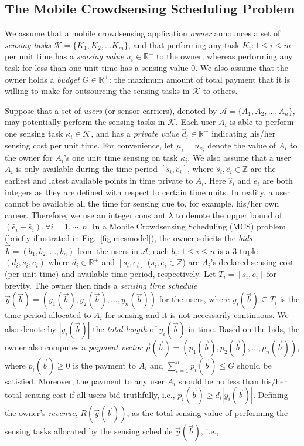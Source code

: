 \documentclass[10pt,journal,compsoc]{IEEEtran}
\begin{document}
  \subsection{The Mobile Crowdsensing Scheduling Problem}
We assume that a mobile crowdsensing application \textit{owner} announces a set of \textit{sensing tasks} $\mathcal{K}=\{K_1,K_2,...K_m\}$, and that performing any task $K_i: 1\leq i\leq m$ per unit time has a \textit{sensing value} $u_i\in \mathbb{R}^+$ to the owner, whereas performing any task for less than one unit time has a sensing value 0.
We also assume that the owner holds a \textit{budget} $G\in \mathbb{R}^+$: the maximum amount of total payment that it is willing to make for outsourcing the sensing tasks in $\mathcal{K}$ to others.

    Suppose that a set of \textit{users} (or sensor carriers), denoted by $\mathcal{A}=\{A_1,A_2,...,A_n\}$, may potentially perform the sensing tasks in $\mathcal{K}$. Each user $A_i$ is able to perform one sensing task $\kappa_i\in \mathcal{K}$, and has a \textit{private value} $\hat{d}_i\in \mathbb{R}^+$ indicating his/her sensing cost per unit time. For convenience, let $\mu_i=u_{\kappa_i}$ denote the value of $A_i$ to the owner for $A_i$'s one unit time sensing on task $\kappa_i$. We also assume that a user $A_i$ is only available during the time period $[\hat{s}_i,\hat{e}_i]$, where $\hat{s}_i,\hat{e}_i \in \mathbb{Z}$ are the earliest and latest available points in time private to $A_i$. Here $\hat{s}_i$ and $\hat{e}_i$ are both integers as they are defined with respect to certain time units. In reality, a user cannot be available all the time for sensing due to, for example, his/her own career. Therefore, we use an integer constant $\lambda$ to denote the upper bound of $(\hat{e}_i - \hat{s}_i), \forall i =  1,\cdots,n$. 
    In a Mobile Crowdsensing Scheduling (MCS) problem (briefly illustrated in Fig.~\ref{fig:mcsmodel}), the owner solicits the \textit{bids} $\vec{b}=(b_1,b_2,...,b_n)$ from the users in $\mathcal{A}$; each $b_i\!:\! 1\leq i\leq n$ is a 3-tuple $(d_i,s_i,e_i)$ where $d_i\in \mathbb{R}^+$ and $[s_i,e_i]$ ($s_i,e_i \in \mathbb{Z}$) are $A_i$'s declared sensing cost (per unit time) and available time period, respectively. Let $T_i = [s_i,e_i]$ for brevity. The owner then finds a \textit{sensing time schedule} $\vec{y}(\vec{b})=(y_1(\vec{b}),y_2(\vec{b}),...,y_n(\vec{b}))$ for the users, where $y_i(\vec{b})\subseteq T_i$ is the time period allocated to $A_i$ for sensing and it is not necessarily continuous. We also denote by $|y_i(\vec{b})|$ the \textit{total length} of $y_i(\vec{b})$ in time. Based on the bids, the owner also computes a \textit{payment vector} $\vec{p}(\vec{b})=(p_1(\vec{b}),p_2(\vec{b}),...,p_n(\vec{b}))$, where $p_i(\vec{b}) \ge 0$ is the payment to $A_i$ and $\sum_{i=1}^n p_i(\vec{b})\leq G$ should be satisfied. Moreover, the payment to any user $A_i$ should be no less than his/her total sensing cost if all users bid truthfully, i.e., $p_i(\vec{b})\geq d_i|y_i(\vec{b})|$. Defining the owner's \textit{revenue}, $R\left(\vec{y}(\vec{b})\right)$, as the total sensing value of performing the sensing tasks allocated by the sensing schedule $\vec{y}(\vec{b})$, i.e.,
\end{document}
